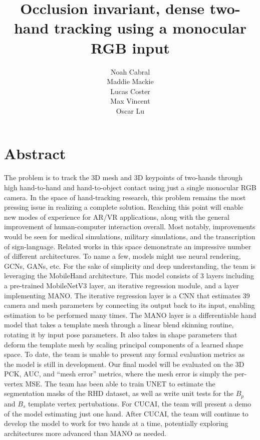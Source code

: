 \documentclass[10pt]{article}
\title{Occlusion invariant, dense two-hand tracking using a monocular RGB input}
\author{Noah Cabral \\ Maddie Mackie \\ Lucas Coster \\ Max Vincent \\ Oscar Lu}
\date{}
\begin{document}
    \maketitle
    \section{Abstract}

    The problem is to track the 3D mesh and 3D keypoints of two-hands through high 
    hand-to-hand and hand-to-object contact using just a single monocular RGB camera. 
    In the space of hand-tracking research, this problem remains the most pressing 
    issue in realizing a complete solution. Reaching this point will enable new modes of 
    experience for AR/VR applications, along with the general improvement of 
    human-computer interaction overall. Most notably, improvements would be seen for medical 
    simulations, 
    military simulations, and the transcription of sign-language. Related works in this space 
    demonstrate an impressive number of different architectures. 
    To name a few, models might use neural rendering, GCNs, GANs, etc. For the sake of simplicity 
    and deep understanding, the team is leveraging the MobileHand 
    architecture. This model consists of 3 layers including a pre-trained MobileNetV3 
    layer, an iterative regression module, and a layer implementing MANO. The iterative regression 
    layer is a CNN that estimates 39 camera and mesh parameters 
    by connecting its output back to its input, enabling estimation to be performed 
    many times. The MANO layer is a differentiable hand model that takes a template mesh through a 
    linear blend skinning routine, rotating it by input pose parameters. It also takes in 
    shape parameters that deform the template mesh by scaling principal components of a learned 
    shape space. To date,
    the team is unable to present any formal evaluation metrics as the model is still in 
    development. Our final model will be evaluated on the 3D PCK, AUC, and “mesh error” metrics, 
    where the mesh error is simply the per-vertex MSE. The team has been able to train UNET to 
    estimate the segmentation masks of the RHD dataset,
    as well as write unit tests for the $B_p$ and $B_s$ template vertex pertubations. For CUCAI, 
    the team will present a demo of the model estimating just one hand. 
    After CUCAI, the team will continue to 
    develop the model to work for two hands at a time, 
    potentially exploring architectures more advanced than MANO as needed.
    
\end{document}
